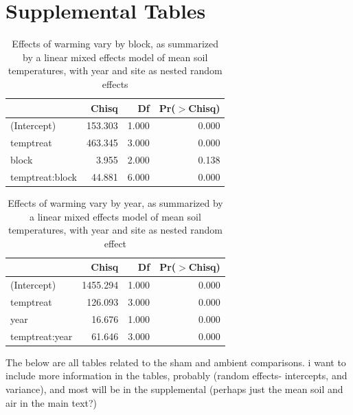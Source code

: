 \documentclass{article}
\begin{document}

\clearpage
\section* {Supplemental Tables}


\begin{table}[ht]
\centering
\begin{tabular}{lrrr}
  \hline
 & Chisq & Df & Pr($>$Chisq) \\ 
  \hline
(Intercept) & 153.303 & 1.000 & 0.000 \\ 
  temptreat & 463.345 & 3.000 & 0.000 \\ 
  block & 3.955 & 2.000 & 0.138 \\ 
  temptreat:block & 44.881 & 6.000 & 0.000 \\ 
   \hline
\end{tabular}
\caption{Effects of warming vary by block, as summarized by a linear mixed effects model of mean soil temperatures, with year and site as nested random effects} 
\end{table}
\begin{table}[ht]
\centering
\begin{tabular}{lrrr}
  \hline
 & Chisq & Df & Pr($>$Chisq) \\ 
  \hline
(Intercept) & 1455.294 & 1.000 & 0.000 \\ 
  temptreat & 126.093 & 3.000 & 0.000 \\ 
  year & 16.676 & 1.000 & 0.000 \\ 
  temptreat:year & 61.646 & 3.000 & 0.000 \\ 
   \hline
\end{tabular}
\caption{Effects of warming vary by year, as summarized by a linear mixed effects model of mean soil temperatures, with year and site as nested random effect} 
\end{table}\par The below are all tables related to the sham and ambient comparisons. i want to include more information in the tables, probably (random effects- intercepts, and variance), and most will be in the supplemental (perhaps just the mean soil and air in the main text?)
\end{document}

